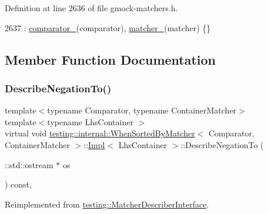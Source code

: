 Definition at line 2636 of file gmock-\/matchers.\+h.


\begin{DoxyCode}
2637         : \hyperlink{classtesting_1_1internal_1_1WhenSortedByMatcher_1_1Impl_a951b20230b095e7777c23cba8f143f32}{comparator\_}(comparator), \hyperlink{classtesting_1_1internal_1_1WhenSortedByMatcher_1_1Impl_a4675b8bb38c5996ad8e570eafe4f72ea}{matcher\_}(matcher) \{\}
\end{DoxyCode}


\subsection{Member Function Documentation}
\mbox{\label{classtesting_1_1internal_1_1WhenSortedByMatcher_1_1Impl_a0a59f77fdbb88a6326e5aba671f2aa3e}} 
\subsubsection{\texorpdfstring{Describe\+Negation\+To()}{DescribeNegationTo()}}
{\footnotesize\ttfamily template$<$typename Comparator, typename Container\+Matcher$>$ \\
template$<$typename Lhs\+Container $>$ \\
virtual void \hyperlink{classtesting_1_1internal_1_1WhenSortedByMatcher}{testing\+::internal\+::\+When\+Sorted\+By\+Matcher}$<$ Comparator, Container\+Matcher $>$\+::\hyperlink{classtesting_1_1internal_1_1WhenSortedByMatcher_1_1Impl}{Impl}$<$ Lhs\+Container $>$\+::Describe\+Negation\+To (\begin{DoxyParamCaption}\item[{\+::std\+::ostream $\ast$}]{os }\end{DoxyParamCaption}) const\hspace{0.3cm}{\ttfamily [inline]}, {\ttfamily [virtual]}}



Reimplemented from \hyperlink{classtesting_1_1MatcherDescriberInterface_a2071afbc47097c4d1c0064275af34db0}{testing\+::\+Matcher\+Describer\+Interface}.



